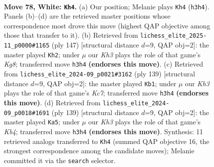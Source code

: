 \documentclass[11pt]{article}
\begin{document}
\clearpage

\begin{figure}[p]\centering
\begin{subfigure}{0.46\textwidth}\centering
\resizebox{\linewidth}{!}{%
\newchessgame
\chessboard[
  setfen={8/8/k7/8/8/1R1N3K/6P1/3r4 w - - 20 78},
  showmover=false,
  pgfstyle=straightmove, color=movearrow, markmove={h3-h4}
]}
\caption{}
\end{subfigure}\hfill
\begin{subfigure}{0.46\textwidth}\centering
\resizebox{\linewidth}{!}{%
\newchessgame
\chessboard[
  setfen={8/4K3/r7/6R1/8/8/5p2/6k1 b - - 3 74},
  showmover=false,
  pgfstyle=straightmove, color=movearrow, markmove={g1-h2}
]}
\caption{}
\end{subfigure}
\\[4pt]
\begin{subfigure}{0.46\textwidth}\centering
\resizebox{\linewidth}{!}{%
\newchessgame
\chessboard[
  setfen={2R5/3r4/8/8/8/1p2K3/2k5/8 b - - 3 70},
  showmover=false,
  pgfstyle=straightmove, color=movearrow, markmove={c2-b1}
]}
\caption{}
\end{subfigure}\hfill
\begin{subfigure}{0.46\textwidth}\centering
\resizebox{\linewidth}{!}{%
\newchessgame
\chessboard[
  setfen={8/8/2p5/1k6/4K3/8/1R6/3r4 b - - 23 70},
  showmover=false,
  pgfstyle=straightmove, color=movearrow, markmove={b5-a5}
]}
\caption{}
\end{subfigure}
\caption{\textbf{Move 78, White: \texttt{Kh4}.} (a) Our position; Melanie plays \texttt{Kh4} (\texttt{h3h4}). Panels (b)--(d) are the retrieved master positions whose correspondence most drove this move (highest QAP objective among those that transfer to it). (b) Retrieved from \texttt{lichess\_elite\_2025-11\_p0000\#1165} (ply 147) [structural distance $d$=9, QAP obj=2]: the master played \texttt{Kh2}; under $\mu$ our \emph{Kh3} plays the role of that game's \emph{Kg8}; transferred move \texttt{h3h4} \textbf{(endorses this move)}. (c) Retrieved from \texttt{lichess\_elite\_2024-09\_p0021\#3162} (ply 139) [structural distance $d$=9, QAP obj=2]: the master played \texttt{Kb1}; under $\mu$ our \emph{Kh3} plays the role of that game's \emph{Kc7}; transferred move \texttt{h3h4} \textbf{(endorses this move)}. (d) Retrieved from \texttt{lichess\_elite\_2024-09\_p0018\#1691} (ply 139) [structural distance $d$=9, QAP obj=2]: the master played \texttt{Ka5}; under $\mu$ our \emph{Kh3} plays the role of that game's \emph{Kb4}; transferred move \texttt{h3h4} \textbf{(endorses this move)}. Synthesis: 11 retrieved analogs transferred to \texttt{Kh4} (summed QAP objective 16, the strongest correspondence among the candidate moves); Melanie committed it via the \texttt{search} selector.}
\label{fig:thought-m154}
\end{figure}
\end{document}
